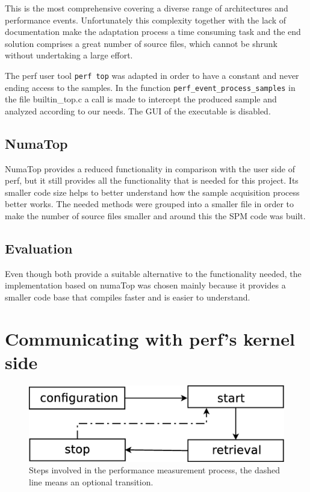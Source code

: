 This is the most comprehensive covering a diverse range of architectures and performance events. Unfortunately this complexity together with the lack of documentation make the adaptation process a time consuming task and the end solution comprises a great number of source files, which cannot be shrunk without undertaking a large effort. 

The perf user tool \texttt{perf top} was adapted in order to have a constant and never ending access to the samples. In the function \texttt{perf\_event\_process\_samples} in the file builtin\_top.c a call is made to intercept the produced sample and analyzed according to our needs. The GUI of the executable is disabled.

\subsection{NumaTop}\label{section:numatop}
NumaTop provides a reduced functionality in comparison with the user side of perf, but it still provides all the functionality that is needed for this project. Its smaller code size helps to better understand how the sample acquisition process better works. The needed methods were grouped into a smaller file in order to make the number of source files smaller and around this the SPM code was built.

\subsection{Evaluation}\label{section:sol-evltn}
Even though both provide a suitable alternative to the functionality needed, the implementation based on numaTop was chosen mainly because it provides a smaller code base that compiles faster and is easier to understand. 

\section{Communicating with perf's kernel side}\label{section:ovv-perfks}

\begin{figure}
	\centering
		\includegraphics[width=.7\textwidth]{figures/sampling-process.eps}
		\caption[Steps of the performance measurement process]{Steps involved in the performance measurement process, the dashed line means an optional transition.}
		\label{fig:sprocess}
\end{figure}

